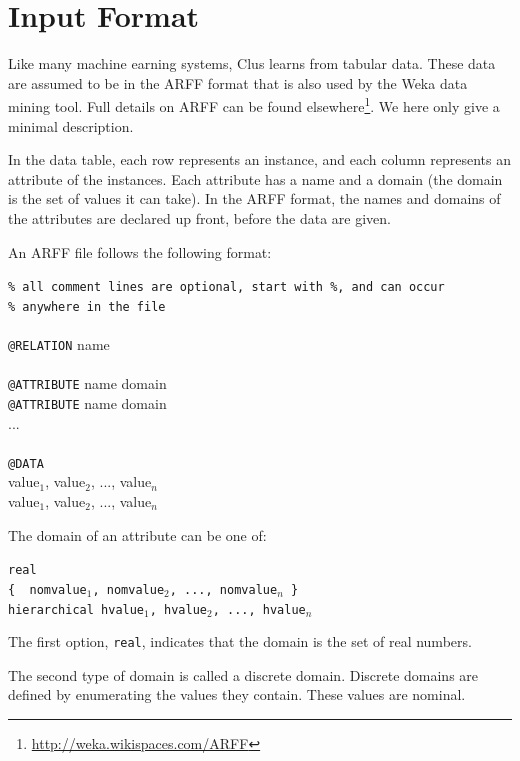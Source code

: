 \documentclass[a4paper]{report}
\begin{document}
\chapter{Input Format}
\label{ch:data}

Like many machine earning systems, Clus learns from tabular data.
These data are assumed to be in the ARFF format that is also used by the Weka data mining tool.  Full details on ARFF can be found elsewhere\footnote{\url{http://weka.wikispaces.com/ARFF}}.
We here only give a minimal description.

In the data table, each row represents an instance, and each column represents an attribute of the instances.  Each attribute has a name and a domain (the domain is the set of values it can take).  In the ARFF format, the names and domains of the attributes are declared up front, before the data are given.

An ARFF file follows the following format:

\begin{tabbing}
{\tt \% all comment lines are optional, start with \%, and can occur }\\
{\tt \% anywhere in the file}\\
\\
{\tt @RELATION} name\\
\\
{\tt @ATTRIBUTE} name domain\\
{\tt @ATTRIBUTE} name domain\\
...\\
\\
{\tt @DATA}\\
value$_1$, value$_2$, ..., value$_n$\\
value$_1$, value$_2$, ..., value$_n$\\
\end{tabbing}

The domain of an attribute can be one of:
\begin{tabbing}
\tt real\\
{\tt \{ } nomvalue$_1$, nomvalue$_2$, ..., nomvalue$_n$ {\tt \} }\\
{\tt hierarchical} hvalue$_1$, hvalue$_2$, ..., hvalue$_n$
\end{tabbing}

The first option, {\tt real}, indicates that the domain is the set of real numbers.

The second type of domain is called a discrete domain.  Discrete domains are defined by enumerating the values they contain.  These values are nominal.
\end{document}
